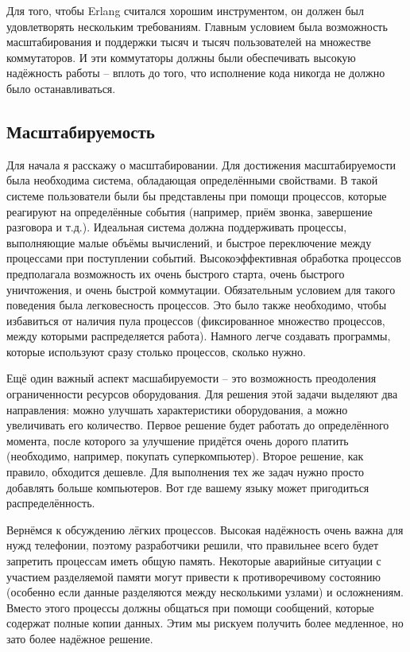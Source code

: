 Для того, чтобы Erlang считался хорошим инструментом, он должен был удовлетворять нескольким требованиям.
Главным условием была возможность масштабирования и поддержки тысяч и тысяч пользователей на множестве коммутаторов.
И эти коммутаторы должны были обеспечивать высокую надёжность работы \--- вплоть до того, что исполнение кода никогда не должно было останавливаться.

\subsection{Масштабируемость}
\label{scalability}
Для начала я расскажу о масштабировании.
Для достижения масштабируемости была необходима система, обладающая определёнными свойствами.
В такой системе пользователи были бы представлены при помощи процессов, которые реагируют на определённые события (например, приём звонка, завершение разговора и т.д.).
Идеальная система должна поддерживать процессы, выполняющие малые объёмы вычислений, и быстрое переключение между процессами при поступлении событий. 
Высокоэффективная обработка процессов предполагала возможность их очень быстрого старта, очень быстрого уничтожения, и очень быстрой коммутации.
Обязательным условием для такого поведения была легковесность процессов.
Это было также необходимо, чтобы избавиться от наличия пула процессов (фиксированное множество процессов, между которыми распределяется работа).
Намного легче создавать программы, которые используют сразу столько процессов, сколько нужно.

Ещё один важный аспект масшабируемости \--- это возможность преодоления ограниченности ресурсов оборудования.
Для решения этой задачи выделяют два направления: можно улучшать характеристики оборудования, а можно увеличивать его количество.
Первое решение будет работать до определённого момента, после которого за улучшение придётся очень дорого платить (необходимо, например, покупать суперкомпьютер).
Второе решение, как правило, обходится дешевле.
Для выполнения тех же задач нужно просто добавлять больше компьютеров.
Вот где вашему языку может пригодиться распределённость.

Вернёмся к обсуждению лёгких процессов.
Высокая надёжность очень важна для нужд телефонии, поэтому разработчики решили, что правильнее всего будет запретить процессам иметь общую память.
Некоторые аварийные ситуации с участием разделяемой памяти могут привести к противоречивому состоянию (особенно если данные разделяются между несколькими узлами) и осложнениям.
Вместо этого процессы должны общаться при помощи сообщений, которые содержат полные копии данных.
Этим мы рискуем получить более медленное, но зато более надёжное решение.
